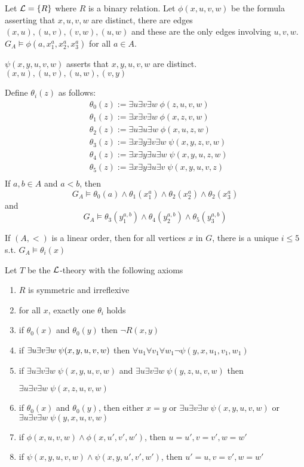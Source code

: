 \documentclass[11pt]{article}
\begin{document}
Let \(\mathcal{L}=\{R\}\) where \(R\) is a binary relation. Let \(\phi(x,u,v,w)\) be the
formula asserting that \(x,u,v,w\) are distinct, there are edges
\((x,u),(u,v),(v,w),(u,w)\) and these are the only edges involving \(u,v,w\).
\(G_A\models\phi(a,x_1^a,x_2^a,x_3^a)\) for all \(a\in A\).

\(\psi(x,y,u,v,w)\) asserts that \(x,y,u,v,w\) are distinct. \((x,u),(u,v),(u,w),(v,y)\)

Define \(\theta_i(z)\) as follows:
\begin{align*}
&\theta_0(z):=\exists u\exists v\exists w\;\phi(z,u,v,w)\\
&\theta_1(z):=\exists x\exists v\exists w\;\phi(x,z,v,w)\\
&\theta_2(z):=\exists u\exists u\exists w\;\phi(x,u,z,w)\\
&\theta_3(z):=\exists x\exists y\exists v\exists w\;\psi(x,y,z,v,w)\\
&\theta_4(z):=\exists x\exists y\exists u\exists w\;\psi(x,y,u,z,w)\\
&\theta_5(z):=\exists x\exists y\exists u\exists v\;\psi(x,y,u,v,z)\\
\end{align*}
If \(a,b\in A\) and \(a<b\), then
\begin{equation*}
G_A\models\theta_0(a)\wedge\theta_1(x^a_1)\wedge\theta_2(x^a_2)\wedge
\theta_2(x^a_3)
\end{equation*}
and 
\begin{equation*}
G_A\models\theta_3(y_1^{a,b})\wedge\theta_4(y_2^{a,b})\wedge\theta_5(
y_3^{a,b})
\end{equation*}
\begin{lemma}[]
If \((A,<)\) is a linear order, then for all vertices \(x\) in \(G\), there is a
unique \(i\le 5\) s.t. \(G_A\models\theta_i(x)\)
\end{lemma}

Let \(T\) be the \(\mathcal{L}\)-theory with the following axioms
\begin{enumerate}
\item \(R\) is symmetric and irreflexive
\item for all \(x\), exactly one \(\theta_i\) holds
\item if \(\theta_0(x)\) and \(\theta_0(y)\) then \(\neg R(x,y)\)
\item if \(\exists u\exists v\exists w\;\psi(x,y,u,v,w)\\\) then
\(\forall u_1\forall v_1\forall w_1\neg\psi(y,x,u_1,v_1,w_1)\)
\item if \(\exists u\exists v\exists w\;\psi(x,y,u,v,w)\) and 
\(\exists u\exists v\exists w\;\psi(y,z,u,v,w)\) then\par
\(\exists u\exists v\exists w\;\psi(x,z,u,v,w)\)
\item if \(\theta_0(x)\) and \(\theta_0(y)\), then either \(x=y\) or 
\(\exists u\exists v\exists w\;\psi(x,y,u,v,w)\) or
\(\exists u\exists v\exists w\;\psi(y,x,u,v,w)\)
\item if \(\phi(x,u,v,w)\wedge\phi(x,u',v',w')\), then
\(u=u',v=v',w=w'\)
\item if \(\psi(x,y,u,v,w)\wedge\psi(x,y,u',v',w')\), then
\(u'=u,v=v',w=w'\)
\end{enumerate}
\end{document}

